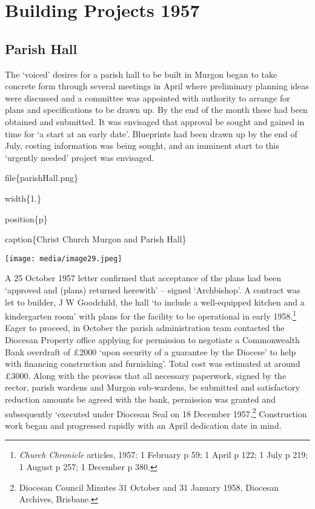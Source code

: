\hypertarget{building-projects-1957}{%
\section{Building Projects 1957}\label{building-projects-1957}}

\hypertarget{parish-hall}{%
\subsection{Parish Hall}\label{parish-hall}}

The `voiced' desires for a parish hall to be built in Murgon began to take concrete form through several meetings in April where preliminary planning ideas were discussed and a committee was appointed with authority to arrange for plans and specifications to be drawn up. By the end of the month these had been obtained and submitted. It was envisaged that approval be sought and gained in time for `a start at an early date'. Blueprints had been drawn up by the end of July, costing information was being sought, and an imminent start to this `urgently needed' project was envisaged.

file\{parishHall.png\}

width\{1.\}

position\{p\}

caption\{Christ Church Murgon and Parish Hall\}

\texttt{[image: media/image29.jpeg]}

A 25 October 1957 letter confirmed that acceptance of the plans had been `approved and (plans) returned herewith' -- signed `Archbishop'. A contract was let to builder, J W Goodchild, the hall `to include a well-equipped kitchen and a kindergarten room' with plans for the facility to be operational in early 1958.\footnote{\emph{Church Chronicle} articles, 1957: 1 February p 59; 1 April p 122; 1 July p 219; 1 August p 257; 1 December p 380.} Eager to proceed, in October the parish administration team contacted the Diocesan Property office applying for permission to negotiate a Commonwealth Bank overdraft of £2000 `upon security of a guarantee by the Diocese' to help with financing construction and furnishing'. Total cost was estimated at around £3000. Along with the provisos that all necessary paperwork, signed by the rector, parish wardens and Murgon sub-wardens, be submitted and satisfactory reduction amounts be agreed with the bank, permission was granted and subsequently `executed under Diocesan Seal on 18 December 1957.\footnote{Diocesan Council Minutes 31 October and 31 January 1958, Diocesan Archives, Brisbane.} Construction work began and progressed rapidly with an April dedication date in mind.

